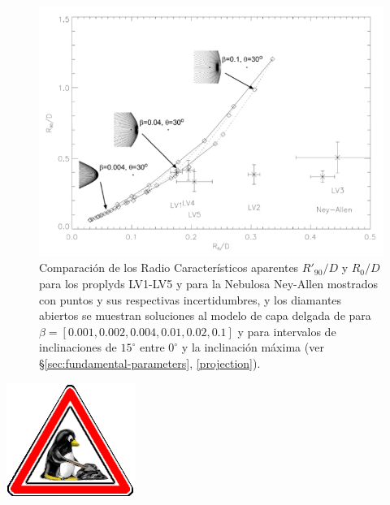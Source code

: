 \begin{figure}
  \includegraphics[width=0.7\linewidth]{./Figures/robberto}
  \caption{Comparación de los Radio Característicos aparentes $R'_{90}/D$ y $R_0/D$ para los proplyds LV1-LV5 y para la Nebulosa Ney-Allen mostrados con puntos y sus respectivas incertidumbres, y los diamantes abiertos se muestran soluciones al modelo de capa delgada de \citep{Canto:1996} para $\beta=[0.001, 0.002, 0.004, 0.01, 0.02, 0.1]$ y para intervalos de inclinaciones de $15^\circ$ entre $0^\circ$ y la inclinación máxima (ver \S \ref{sec:fundamental-parameters}, \ref{projection}).}
  \label{fig:Robberto}
\end{figure}


\includegraphics[width=0.1\linewidth]{./Figures/tux-development}
